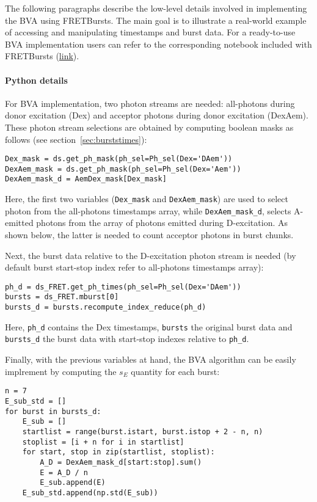 The following paragraphs describe the low-level details involved in implementing the BVA using FRETBursts.
The main goal is to illustrate a real-world example of accessing and manipulating timestamps and burst data.
For a ready-to-use BVA implementation users can refer to the corresponding notebook included with FRETBursts
(\href{http://nbviewer.jupyter.org/github/tritemio/FRETBursts_notebooks/blob/master/notebooks/Example%20-%20Burst%20Variance%20Analysis.ipynb}{link}).

\paragraph{Python details}
For BVA implementation, two photon streams are needed: all-photons during donor excitation (Dex) 
and acceptor photons during donor excitation (DexAem). 
These photon stream selections are obtained by computing boolean masks as follows 
(see section~\ref{sec:burststimes}):

\begin{lstlisting}
Dex_mask = ds.get_ph_mask(ph_sel=Ph_sel(Dex='DAem'))   
DexAem_mask = ds.get_ph_mask(ph_sel=Ph_sel(Dex='Aem'))
DexAem_mask_d = AemDex_mask[Dex_mask]
\end{lstlisting}

Here, the first two variables (\verb|Dex_mask| and \verb|DexAem_mask|) are used to
select photon from the all-photons timestamps array,
while \verb|DexAem_mask_d|, selects A-emitted photons from the
array of photons emitted during D-excitation. As shown below, 
the latter is needed to count acceptor photons in burst chunks.

Next, the burst data relative to the D-excitation photon stream is needed (by default 
burst start-stop index refer to all-photons timestamps array):

\begin{lstlisting}
ph_d = ds_FRET.get_ph_times(ph_sel=Ph_sel(Dex='DAem'))
bursts = ds_FRET.mburst[0] 
bursts_d = bursts.recompute_index_reduce(ph_d)
\end{lstlisting}

Here, \verb|ph_d| contains the Dex timestamps, \verb|bursts| the original burst data and 
\verb|bursts_d| the burst data with start-stop indexes relative to \verb|ph_d|.

Finally, with the previous variables at hand, the BVA algorithm
can be easily implrement by computing the $s_E$ quantity for each burst:

\begin{lstlisting}
n = 7
E_sub_std = []
for burst in bursts_d:
    E_sub = []
    startlist = range(burst.istart, burst.istop + 2 - n, n)
    stoplist = [i + n for i in startlist]
    for start, stop in zip(startlist, stoplist): 
        A_D = DexAem_mask_d[start:stop].sum()
        E = A_D / n
        E_sub.append(E)
    E_sub_std.append(np.std(E_sub))
\end{lstlisting}

